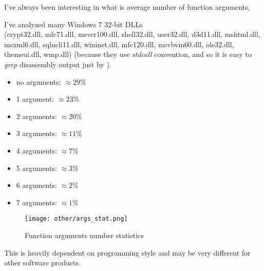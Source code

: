 \label{args_stat}

I've always been interesting in what is average number of function arguments.

I've analyzed many Windows 7 32-bit DLLs \\
(crypt32.dll, mfc71.dll, msvcr100.dll, shell32.dll, 
user32.dll, d3d11.dll, mshtml.dll, msxml6.dll, sqlncli11.dll, wininet.dll, mfc120.dll, msvbvm60.dll, ole32.dll, themeui.dll, wmp.dll) 
(because they use \emph{stdcall} convention, and so it is easy to \emph{grep} disassembly output just by ).

\begin{itemize}
\item no arguments: $\approx 29\%$
\item 1 argument: $\approx 23\%$
\item 2 arguments: $\approx 20\%$
\item 3 arguments: $\approx 11\%$
\item 4 arguments: $\approx 7\%$
\item 5 arguments: $\approx 3\%$
\item 6 arguments: $\approx 2\%$
\item 7 arguments: $\approx 1\%$
\end{itemize}

\begin{figure}[H]
\centering
\texttt{[image: other/args\_stat.png]}
\caption{Function arguments number statistics}
\end{figure}

This is heavily dependent on programming style and may be very different for other software products.

